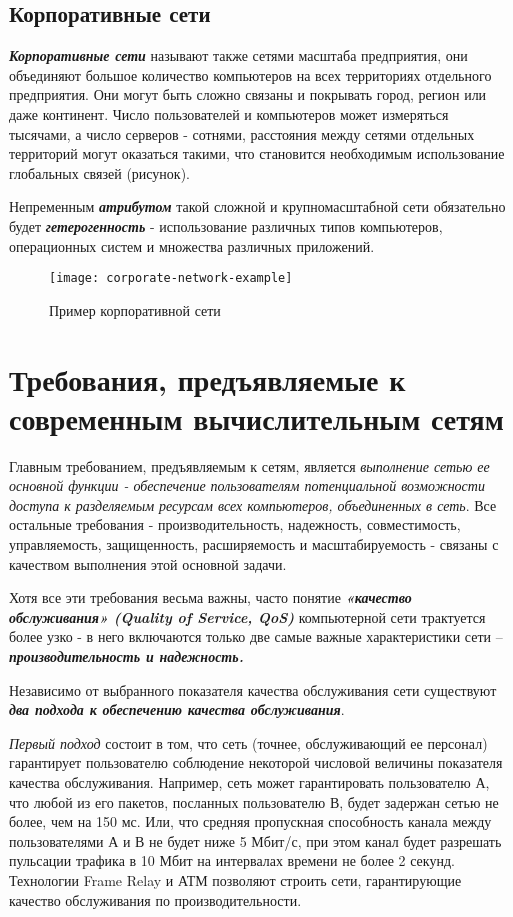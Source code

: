 \subsection{Корпоративные сети}

\textbf{\textit{Корпоративные сети}} называют также сетями масштаба предприятия, они объединяют большое количество компьютеров на всех территориях отдельного предприятия.
Они могут быть сложно связаны и покрывать город, регион или даже континент.
Число пользователей и компьютеров может измеряться тысячами, а число серверов - сотнями, расстояния между сетями отдельных территорий могут оказаться такими, что становится необходимым использование глобальных связей (рисунок).

Непременным \textbf{\textit{атрибутом}} такой сложной и крупномасштабной сети обязательно будет \textbf{\textit{гетерогенность}} - использование различных типов компьютеров, операционных систем и множества различных приложений.

\begin{figure}
    \centering
    \texttt{[image: corporate-network-example]}
    \caption{Пример корпоративной сети}
    \label{fig:corporate-network-example}
\end{figure}

\section{Требования, предъявляемые к современным  вычислительным сетям}

Главным требованием, предъявляемым к сетям, является \emph{выполнение сетью ее основной функции - обеспечение пользователям потенциальной возможности доступа к разделяемым ресурсам всех компьютеров, объединенных в сеть}.
Все остальные требования - производительность, надежность, совместимость, управляемость, защищенность, расширяемость и масштабируемость - связаны с качеством выполнения этой основной задачи.

Хотя все эти требования весьма важны, часто понятие \textbf{\textit{«качество обслуживания» (Quality of Service, QoS)}} компьютерной сети трактуется более узко - в него включаются только две самые важные характеристики сети – \textbf{\textit{производительность и надежность.}}

Независимо от выбранного показателя качества обслуживания сети существуют \textbf{\textit{два подхода к обеспечению качества обслуживания}}.

\emph{Первый подход} состоит в том, что сеть (точнее, обслуживающий ее персонал) гарантирует пользователю соблюдение некоторой числовой величины показателя качества обслуживания.
Например, сеть может гарантировать пользователю А, что любой из его пакетов, посланных пользователю В, будет задержан сетью не более, чем на 150 мс.
Или, что средняя пропускная способность канала между пользователями А и В не будет ниже 5 Мбит/с, при этом канал будет разрешать пульсации трафика в 10 Мбит на интервалах времени не более 2 секунд.
Технологии Frame Relay и АТМ позволяют строить сети, гарантирующие качество обслуживания по производительности.

